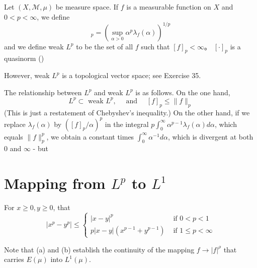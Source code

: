 \documentclass[12pt, a4paper, oneside]{book}
\begin{document}
\begin{definition}
    Let $\left(X,\mathcal{M},\mu\right)$ be measure space.
    If $f$ is a measurable function on $X$ and $0<p<\infty$, we define
    \begin{equation*}
        [f]_p=\left(\sup _{\alpha>0} \alpha^p \lambda_f(\alpha)\right)^{1 / p}
    \end{equation*}
    and we define weak $L^p$ to be the set of all $f$ such that $[f]_p<\infty$。 $\left[\cdot\right]_p$ is a quasinorm ()

    However, weak $L^p$ is a topological vector space; see Exercise 35.

    The relationship between $L^p$ and weak $L^p$ is as follows. On the one hand,
    \begin{equation*}
        L^p \subset \text { weak } L^p, \quad \text { and } \quad[f]_p \leq\|f\|_p
    \end{equation*}
    (This is just a restatement of Chebyshev's inequality.) On the other hand, if we replace $\lambda_f(\alpha)$ by $\left([f]_p / \alpha\right)^p$ in the integral $p \int_0^{\infty} \alpha^{p-1} \lambda_f(\alpha) d \alpha$, which equals $\|f\|_p^p$, we obtain a constant times $\int_0^{\infty} \alpha^{-1} d \alpha$, which is divergent at both 0 and $\infty$ - but
\end{definition}







\section{Mapping from \texorpdfstring{$L^p$}{} to \texorpdfstring{$L^1$}{}}

\begin{lemma}
    For $x \geq 0, y \geq 0$, that
    \begin{equation*}
        \left|x^p-y^p\right| \leq \begin{cases}|x-y|^p & \text { if } 0<p<1 \\ p|x-y|\left(x^{p-1}+y^{p-1}\right) & \text { if } 1 \leq p<\infty\end{cases}
    \end{equation*}

    Note that (a) and (b) establish the continuity of the mapping $f \rightarrow|f|^\rho$ that carries $E(\mu)$ into $L^1(\mu)$.
\end{lemma}
\end{document}
